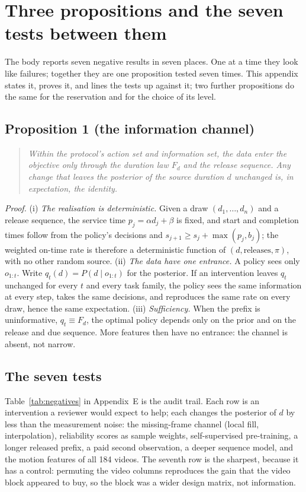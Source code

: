 \section{Three propositions and the seven tests between them}
\label{app:propositions}

The body reports seven negative results in seven places. One at a time they look like failures;
together they are one proposition tested seven times. This appendix states it, proves it, and
lines the tests up against it; two further propositions do the same for the reservation and for
the choice of its level.

\subsection*{Proposition 1 (the information channel)}

\begin{quote}
\itshape
Within the protocol's action set and information set, the data enter the objective only through
the duration law $F_d$ and the release sequence. Any change that leaves the posterior of the
source duration $d$ unchanged is, in expectation, the identity.
\end{quote}

\noindent\emph{Proof.}
(i) \emph{The realisation is deterministic.} Given a draw $(d_1,\dots,d_n)$ and a release
sequence, the service time $p_j=\alpha d_j+\beta$ is fixed, and start and completion times follow
from the policy's decisions and $s_{j+1}\ge s_j+\max(p_j,b_j)$; the weighted on-time rate is
therefore a deterministic function of $(d,\text{releases},\pi)$, with no other random source.
(ii) \emph{The data have one entrance.} A policy sees only $o_{1:t}$. Write $q_t(d)=P(d\mid o_{1:t})$
for the posterior. If an intervention leaves $q_t$ unchanged for every $t$ and every task family,
the policy sees the same information at every step, takes the same decisions, and reproduces the
same rate on every draw, hence the same expectation.
(iii) \emph{Sufficiency.} When the prefix is uninformative, $q_t\equiv F_d$, the optimal policy
depends only on the prior and on the release and due sequence. More features then have no
entrance: the channel is absent, not narrow.

\subsection*{The seven tests}

Table~\ref{tab:negatives} in Appendix~E is the audit trail. Each row is an intervention a
reviewer would expect to help; each changes the posterior of $d$ by less than the measurement
noise: the missing-frame channel (local fill, interpolation), reliability scores as sample
weights, self-supervised pre-training, a longer released prefix, a paid second observation, a
deeper sequence model, and the motion features of all 184 videos. The seventh row is the
sharpest, because it has a control: permuting the video columns reproduces the gain that the
video block appeared to buy, so the block was a wider design matrix, not information.

